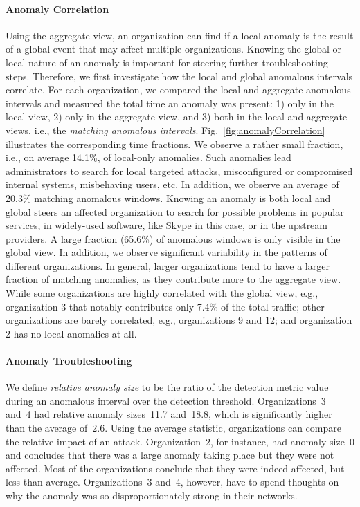 \documentclass[letterpaper,11pt,onecolumn,titlepage]{article}
\begin{document}
\paragraph{Anomaly Correlation}

Using the aggregate view, an organization can find if a local anomaly
is the result of a global event that may affect multiple
organizations. Knowing the global or local nature of an anomaly is
important for steering further troubleshooting steps. Therefore, we
first investigate how the local and global anomalous intervals
correlate. For each organization, we compared the local and aggregate
anomalous intervals and measured the total time an anomaly was
present: 1) only in the local view, 2) only in the aggregate view, and
3) both in the local and aggregate views, i.e., the {\it matching
anomalous intervals}. Fig.~\ref{fig:anomalyCorrelation} illustrates
the corresponding time fractions. We
observe a rather small fraction, i.e., on average 14.1\%, of
local-only anomalies. Such anomalies lead administrators to
search for local targeted attacks, misconfigured or compromised
internal systems, misbehaving users, etc.  In addition, we observe an
average of 20.3\% matching anomalous windows. Knowing an anomaly is
both local and global steers an affected organization to search
for possible problems in popular services, in widely-used software,
like Skype in this case, or in the upstream providers.
A large fraction (65.6\%) of
anomalous windows is only visible in the global view.
In addition, we observe significant variability in the patterns of
different organizations. In general, larger organizations tend to have
a larger fraction of matching anomalies, as they contribute more to
the aggregate view. While some organizations are highly correlated
with the global view, e.g., organization 3 that notably contributes
only 7.4\% of the total traffic; other organizations are barely
correlated, e.g., organizations 9 and 12; and organization 2 has no
local anomalies at all.




\paragraph{Anomaly Troubleshooting}
We define {\it relative anomaly size} to be the ratio of the detection
metric value during an anomalous interval over the detection
threshold.  Organizations~3 and~4 had relative anomaly sizes~11.7
and~18.8, which is significantly higher than the average of~2.6. Using the
average statistic, organizations can compare the relative impact of an
attack. Organization~2, for instance, had anomaly size~0 and 
concludes that there was a large anomaly taking place but they were not
affected.  Most of the organizations conclude that they were
indeed affected, but less than average.  Organizations~3 and~4,
however, have to spend thoughts on why the anomaly was so
disproportionately strong in their networks.
\end{document}
